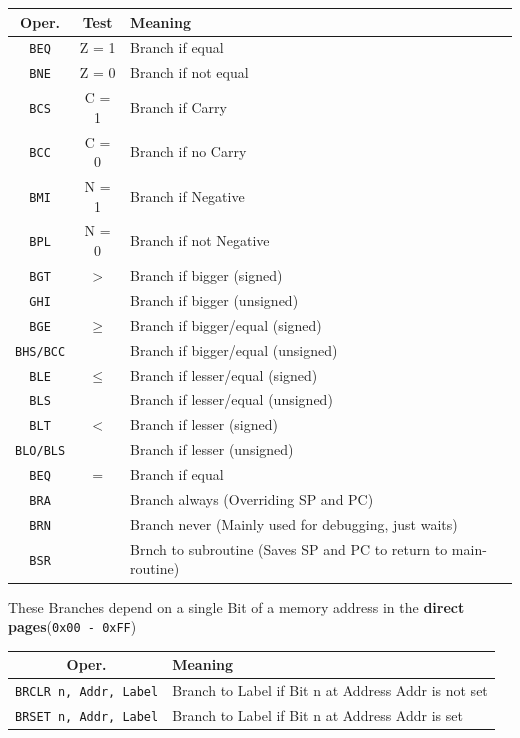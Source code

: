 \documentclass[a4paper, 11pt, nofootinbib]{book}
\renewcommand*{\thead}[1]{\bfseries #1}
\newcommand{\code}[1]{\texttt{#1}}
\begin{document}
\begin{tabular}{|c|c|l|}
	\hline
	\thead{Oper.}& \thead{Test} & \thead{Meaning}\\
	\hline
	\code{BEQ} & Z = 1 & Branch if equal\\
	\code{BNE} & Z = 0& Branch if not equal\\
	\hline
	\code{BCS} & C = 1& Branch if Carry\\
	\code{BCC} & C = 0& Branch if no Carry\\
	\hline
	\code{BMI} & N = 1& Branch if Negative\\
	\code{BPL} & N = 0& Branch if not Negative\\
	\hline
	\code{BGT} &$>$ & Branch if bigger (signed)\\
	\code{GHI} & &  Branch if bigger (unsigned)\\
	\hline
	\code{BGE} &$\geq$& Branch if bigger/equal (signed)\\
	\code{BHS/BCC} & & Branch if bigger/equal (unsigned)\\
	\hline
	\code{BLE} &$\leq$& Branch if lesser/equal (signed)\\
	\code{BLS} & & Branch if lesser/equal (unsigned)\\
	\hline
	\code{BLT} &$<$& Branch if lesser (signed)\\
	\code{BLO/BLS} & & Branch if lesser (unsigned)\\
	\hline
	\code{BEQ} &$=$& Branch if equal\\
	\hline
	\code{BRA} & & Branch always (Overriding SP and PC) \\
	\code{BRN} & & Branch never (Mainly used for debugging, just waits) \\
	\code{BSR} & & Brnch to subroutine (Saves SP and PC to return to main-routine) \\
	\hline
\end{tabular}
\vspace{10px}

\noindent These Branches depend on a single Bit of a memory address in the \textbf{direct pages}(\code{0x00 - 0xFF})
\begin{tabular}{|c|l|}
	\hline
	\thead{Oper.} & \thead{Meaning} \\
	\hline
	\code{BRCLR n, Addr, Label} & Branch to Label if Bit n at Address Addr is not set \\
	\hline
	\code{BRSET n, Addr, Label} & Branch to Label if Bit n at Address Addr is set \\
	\hline
\end{tabular}
\end{document}
